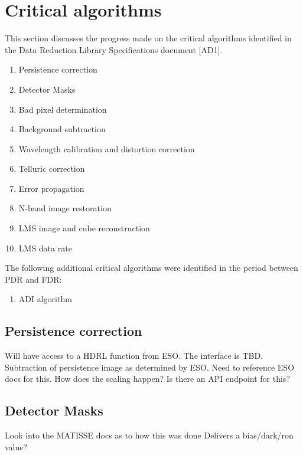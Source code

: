 \clearpage
\section{Critical algorithms}\label{sec:critical_algorithms}

This section discusses the progress made on the critical algorithms identified in the Data Reduction Library Specifications document [AD1].

\begin{enumerate}
    \item Persistence correction
    \item Detector Masks
    \item Bad pixel determination
    \item Background subtraction
    \item Wavelength calibration and distortion correction
    \item Telluric correction
    \item Error propagation
    \item N-band image restoration
    \item LMS image and cube reconstruction
    \item LMS data rate
\end{enumerate}

The following additional critical algorithms were identified in the period between PDR and FDR:

\begin{enumerate}
    \item ADI algorithm
\end{enumerate}

\subsection{Persistence correction}

Will have access to a HDRL function from ESO. 
The interface is TBD.
Subtraction of persistence image as determined by ESO.
Need to reference ESO docs for this.
How does the scaling happen?
Is there an API endpoint for this?

\subsection{Detector Masks}

Look into the MATISSE docs as to how this was done
Delivers a bias/dark/ron value?


